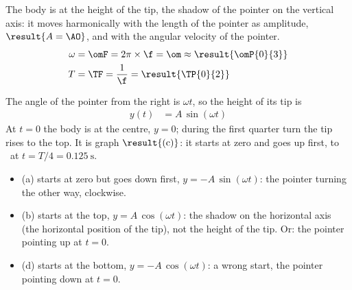\begin{abcliste}
\abc The body is at the height of the tip, the shadow of the pointer on the vertical axis: it moves harmonically with the length of the pointer as amplitude, $\result{A = \AO}$, and with the angular velocity of the pointer.
\begin{align}
 \omega &= \omF = 2\pi\times\f = \om \approx \result{\omP{0}{3}} \\
 T &= \TF = \frac{1}{\f} = \result{\TP{0}{2}}
\end{align}

\abc The angle of the pointer from the right is $\omega t$, so the height of its tip is
\begin{align}
 y(t) &= A\,\sin(\omega t)
\end{align}
At $t = 0$ the body is at the centre, $y = 0$; during the first quarter turn the tip rises to the top. It is graph $\result{\text{(c)}}$: it starts at zero and goes up first, to \AO\ at $t = T/4 = \SI{0.125}{\second}$.

\abc
\begin{itemize}
\item (a) starts at zero but goes down first, $y = -A\,\sin(\omega t)$: the pointer turning the other way, clockwise.
\item (b) starts at the top, $y = A\,\cos(\omega t)$: the shadow on the horizontal axis (the horizontal position of the tip), not the height of the tip. Or: the pointer pointing up at $t = 0$.
\item (d) starts at the bottom, $y = -A\,\cos(\omega t)$: a wrong start, the pointer pointing down at $t = 0$.
\end{itemize}
\end{abcliste}

